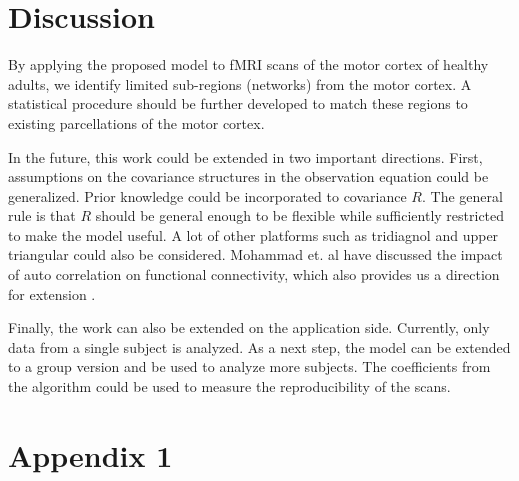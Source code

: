 \documentclass[fleqn]{article}
\begin{document}
%
%
%
\section{Discussion}
By applying the proposed model to fMRI scans of the motor cortex of healthy adults, we identify limited sub-regions (networks) from the motor cortex. A statistical procedure should be further developed to match these regions to existing parcellations of the motor cortex.

In the future, this work could be extended in two important directions. First, assumptions on the covariance structures in the observation equation could be generalized. Prior knowledge could be incorporated to covariance $R$. The general rule is that $R$ should be general enough to be flexible while sufficiently restricted to make the model useful. A lot of other platforms such as tridiagnol and upper triangular could also be considered. Mohammad et. al have discussed the impact of auto correlation on functional connectivity, which also provides us a direction for extension \cite{arbabshirani2014impact}.

Finally, the work can also be extended on the application side. Currently, only data from a single subject is analyzed. As a next step, the model can be extended to a group version and be used to analyze more subjects. The coefficients from the algorithm could be used to measure the reproducibility of the scans.

\section*{Appendix 1}
\label{sec:appendix1}
\end{document}
